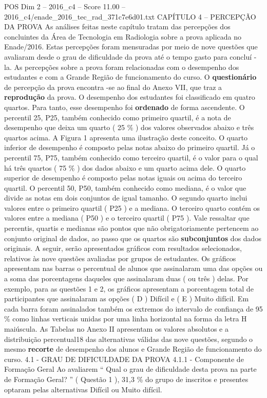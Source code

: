 \begin{textsample}{POS Dim 2 – 2016\_c4 – Score 11.00 – 2016\_c4/enade\_2016\_tec\_rad\_371c7e6d01.txt}  \label{ex:f2_pos_077}
CAPÍTULO 4 – PERCEPÇÃO DA PROVA As análises feitas neste capítulo tratam das percepções dos concluintes da Área de Tecnologia em Radiologia sobre a prova aplicada no Enade/2016.
Estas percepções foram mensuradas por meio de nove questões que avaliaram desde o grau de dificuldade da prova até o tempo gasto para concluí -la.
As percepções sobre a prova foram relacionadas com o desempenho dos estudantes e com a Grande Região de funcionamento do curso.
O \textbf{questionário} de percepção da prova encontra -se ao final do Anexo VII, que traz a \textbf{reprodução} da prova.
O desempenho dos estudantes foi classificado em quatro quartos.
Para tanto, esse desempenho foi \textbf{ordenado} de forma ascendente.
O percentil 25, P25, também conhecido como primeiro quartil, é a nota de desempenho que deixa um quarto ( 25 \% ) dos valores observados abaixo e três quartos acima.
A Figura 1 apresenta uma ilustração deste conceito.
O quarto inferior de desempenho é composto pelas notas abaixo do primeiro quartil.
Já o percentil 75, P75, também conhecido como terceiro quartil, é o valor para o qual há três quartos ( 75 \% ) dos dados abaixo e um quarto acima dele.
O quarto superior de desempenho é composto pelas notas iguais ou acima do terceiro quartil.
O percentil 50, P50, também conhecido como mediana, é o valor que divide as notas em dois conjuntos de igual tamanho.
O segundo quarto inclui valores entre o primeiro quartil ( P25 ) e a mediana.
O terceiro quarto contém os valores entre a mediana ( P50 ) e o terceiro quartil ( P75 ).
Vale ressaltar que percentis, quartis e medianas são pontos que não obrigatoriamente pertencem ao conjunto original de dados, ao passo que os quartos são \textbf{subconjuntos} dos dados originais.
A seguir, serão apresentados gráficos com resultados selecionados, relativos às nove questões avaliadas por grupos de estudantes.
Os gráficos apresentam nas barras o percentual de alunos que assinalaram uma das opções ou a soma das porcentagens daqueles que assinalaram duas ( ou três ) delas.
Por exemplo, para as questões 1 e 2, os gráficos apresentam a porcentagem total de participantes que assinalaram as opções ( D ) Difícil e ( E ) Muito difícil.
Em cada barra foram assinalados também os extremos do intervalo de confiança de 95 \% como linhas verticais unidas por uma linha horizontal na forma da letra H maiúscula.
As Tabelas no Anexo II apresentam os valores absolutos e a distribuição percentual18 das alternativas válidas das nove questões, segundo o mesmo \textbf{recorte} de desempenho dos alunos e Grande Região de funcionamento do curso. 4.1 - GRAU DE DIFICULDADE DA PROVA 4.1.1 - Componente de Formação Geral Ao avaliarem “ Qual o grau de dificuldade desta prova na parte de Formação Geral? ” ( Questão 1 ), 31,3 \% do grupo de inscritos e presentes optaram pelas alternativas Difícil ou Muito difícil.

\end{textsample}
